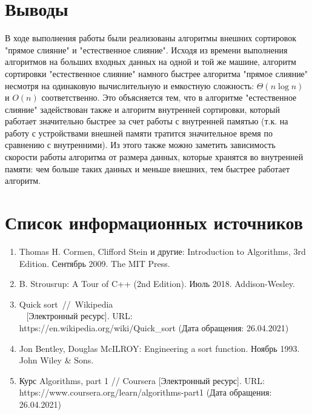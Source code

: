 \documentclass[a4paper, 14pt]{extarticle}
\begin{document}
\section*{Выводы}
В ходе выполнения работы были реализованы алгоритмы внешних
сортировок "прямое слияние" и "естественное слияние". Исходя из времени
выполнения алгоритмов на больших входных данных на одной и той же машине,
алгоритм сортировки "естественное слияние" намного быстрее алгоритма
"прямое слияние" несмотря на одинаковую
вычислительную и емкостную сложность: $\Theta(n\log n)$ и $O(n)$ соответственно.
Это объясняется тем, что в алгоритме "естественное слияние" задействован
также и алгоритм внутренней сортировки, который работает значительно
быстрее за счет работы с внутренней памятью (т.к. на работу с устройствами
внешней памяти тратится значительное время по сравнению с внутренними). Из этого
также можно заметить зависимость скорости работы алгоритма
от размера данных, которые хранятся во внутренней памяти: чем больше таких
данных и меньше внешних, тем быстрее работает алгоритм.

\section*{Список информационных источников}
\begin{enumerate}[leftmargin=*] %
  \item Thomas H. Cormen, Clifford Stein и другие: Introduction to Algorithms, 3rd Edition.
    Сентябрь 2009. The MIT Press.
  \item B. Strousrup: A Tour of C++ (2nd Edition). Июль 2018. Addison-Wesley.
  \item Quick sort~//~Wikipedia \\~
    [Электронный ресурс]. URL:
    \\ https://en.wikipedia.org/wiki/Quick\_sort
    (Дата обращения: 26.04.2021)
  \item Jon Bentley, Douglas McILROY: Engineering a sort function. Ноябрь 1993.
    John Wiley \& Sons.
   \item Курс Algorithms, part 1 // Coursera [Электронный ресурс]. URL:
     \\ https://www.coursera.org/learn/algorithms-part1
     (Дата обращения: 26.04.2021)
\end{enumerate}
\end{document}
